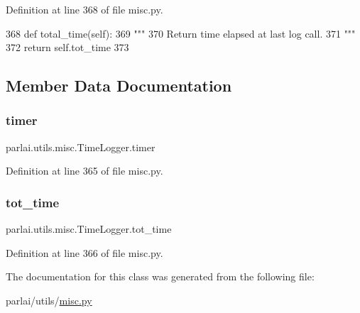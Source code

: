 Definition at line 368 of file misc.\+py.


\begin{DoxyCode}
368     \textcolor{keyword}{def }total\_time(self):
369         \textcolor{stringliteral}{"""}
370 \textcolor{stringliteral}{        Return time elapsed at last log call.}
371 \textcolor{stringliteral}{        """}
372         \textcolor{keywordflow}{return} self.tot\_time
373 
\end{DoxyCode}


\subsection{Member Data Documentation}
\mbox{\label{classparlai_1_1utils_1_1misc_1_1TimeLogger_a7592e5ebb754f91e73b66b409fda2d77}} 
\subsubsection{\texorpdfstring{timer}{timer}}
{\footnotesize\ttfamily parlai.\+utils.\+misc.\+Time\+Logger.\+timer}



Definition at line 365 of file misc.\+py.

\mbox{\label{classparlai_1_1utils_1_1misc_1_1TimeLogger_a831849f16f6779f8b77289c3caa65689}} 
\subsubsection{\texorpdfstring{tot\+\_\+time}{tot\_time}}
{\footnotesize\ttfamily parlai.\+utils.\+misc.\+Time\+Logger.\+tot\+\_\+time}



Definition at line 366 of file misc.\+py.



The documentation for this class was generated from the following file\+:\begin{DoxyCompactItemize}
\item 
parlai/utils/\hyperlink{misc_8py}{misc.\+py}\end{DoxyCompactItemize}
